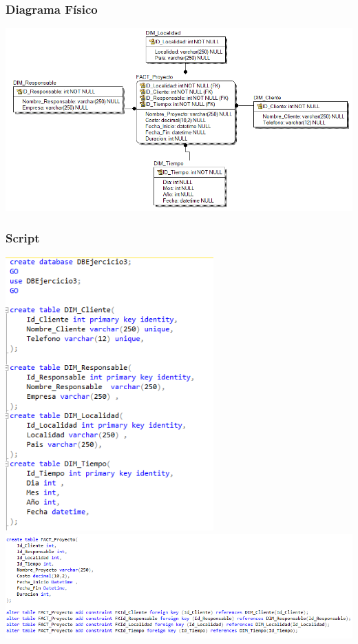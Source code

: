 \begin{itemize}
   \subsubsection{Diagrama Físico }
	
	\begin{center}
	\includegraphics[width=14cm]{./Imagenes/ejercicio3_fisico}
	\end{center}

 \subsubsection{Script }
\begin{center}
	\includegraphics[width=8cm]{./Imagenes/ej3_script1}
	\includegraphics[width=14cm]{./Imagenes/ej3_script2}
	\end{center}

\end{itemize}
		
